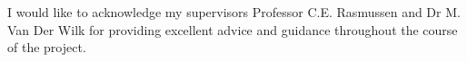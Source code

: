 
\begin{acknowledgements}      
I would like to acknowledge my supervisors Professor C.E. Rasmussen and Dr M. Van Der Wilk 
for providing excellent advice and guidance throughout the course of the project.
\end{acknowledgements}
